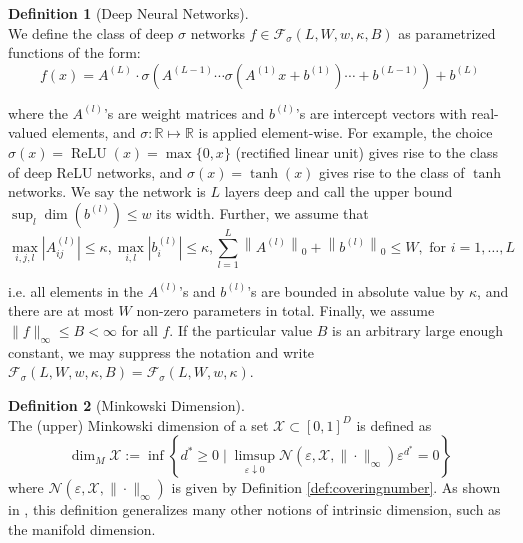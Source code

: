 \documentclass[12pt]{article}
\theoremstyle{myplain}
\theoremstyle{definition}
\theoremstyle{definition}
\newtheorem{definition}{Definition}
\theoremstyle{remark}
\numberwithin{equation}{section}
\begin{document}
\begin{definition}[Deep Neural Networks]\label{def:neuralnets}\ \\
We define the class of deep $\sigma$ networks $f\in \mathcal{F}_{\sigma}(L, W, w, \kappa, B)$ as parametrized functions of the form:
\[f(x)=A^{(L)} \cdot \sigma\left(A^{(L-1)} \cdots \sigma\left(A^{(1)} x+b^{(1)}\right) \cdots+b^{(L-1) }\right)+b^{(L)}\]

where the $A^{(l)}$'s are weight matrices and $b^{(l)}$'s are intercept vectors with real-valued elements, and $\sigma: \mathbb{R}\mapsto \mathbb{R}$ is applied element-wise. For example, the choice $\sigma(x)=\operatorname{ReLU}(x)=\max \{0, x\}$ (rectified linear unit) gives rise to the class of deep ReLU networks, and $\sigma(x)=\tanh{(x)}$ gives rise to the class of $\tanh$ networks. We say the network is $L$ layers deep and call the upper bound $\sup_{l} \operatorname{dim}(b^{(l)})\leq w$ its width. Further, we assume that \[\max_{i, j, l}\left|A^{(l)}_{i j}\right| \leq \kappa,\max_{i, l} |b^{(l)}_i| \leq \kappa, \sum_{l=1}^{L}\left\|A^{(l)}\right\|_{0}+\left\|b^{(l)}\right\|_{0} \leq W, \text { for } i=1, \ldots, L\]

i.e. all elements in the $A^{(l)}$'s and $b^{(l)}$'s are bounded in absolute value by $\kappa$, and there are at most $W$ non-zero parameters in total. Finally, we assume $\|f\|_\infty \leq B<\infty$ for all $f$. If the particular value $B$ is an arbitrary large enough constant, we may suppress the notation and write $\mathcal{F}_{\sigma}(L, W, w, \kappa, B)=\mathcal{F}_{\sigma}(L, W, w, \kappa)$.
\end{definition}

\begin{definition}[Minkowski Dimension]\label{def:minkowski}\ \\
The (upper) Minkowski dimension of a set ${\mathcal{X}} \subset[0,1]^{D}$ is defined as
\[\operatorname{dim}_{M} {\mathcal{X}}:=\inf \left\{d^{*} \geq 0 \mid \limsup _{\varepsilon \downarrow 0} \mathcal{N}(\varepsilon, {\mathcal{X}}, \|\cdot\|_\infty) \varepsilon^{d^{*}}=0\right\}\]
where $\mathcal{N}(\varepsilon, {\mathcal{X}}, \|\cdot\|_\infty)$ is given by Definition \ref{def:coveringnumber}. As shown in \cite{minkowski}, this definition generalizes many other notions of intrinsic dimension, such as the manifold dimension. 
\end{definition}
\end{document}
